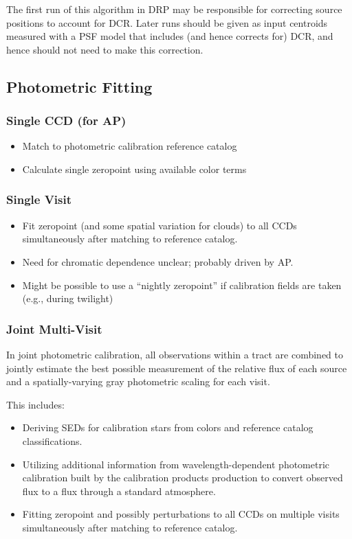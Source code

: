 The first run of this algorithm in DRP may be responsible for correcting source positions to account for DCR.  Later runs should be given as input centroids measured with a PSF model that includes (and hence corrects for) DCR, and hence should not need to make this correction.

\subsection{Photometric Fitting}
\label{sec:acPhotometricFitting}
\subsubsection{Single CCD (for AP)}
\label{sec:acSingleCCDPhotometricFit}
\begin{itemize}
\item Match to photometric calibration reference catalog
\item Calculate single zeropoint using available color terms
\end{itemize}
\subsubsection{Single Visit}
\label{sec:acSingleVisitPhotometricFit}
\begin{itemize}
\item Fit zeropoint (and some spatial variation for clouds) to all CCDs simultaneously after matching to reference catalog.
\item Need for chromatic dependence unclear; probably driven by AP.
\item Might be possible to use a ``nightly zeropoint'' if calibration fields are taken (e.g., during twilight)
\end{itemize}


\subsubsection{Joint Multi-Visit}
\label{sec:acJointPhotometricFit}

In joint photometric calibration, all observations within a tract are combined to jointly estimate the best possible measurement of the relative flux of each source and a spatially-varying gray photometric scaling for each visit.

This includes:
\begin{itemize}
\item Deriving SEDs for calibration stars from colors and reference catalog classifications.
\item Utilizing additional information from wavelength-dependent photometric calibration built by the calibration products production to convert observed flux to a flux through a standard atmosphere.
\item Fitting zeropoint and possibly perturbations to all CCDs on multiple visits simultaneously after matching to reference catalog.
\end{itemize}

